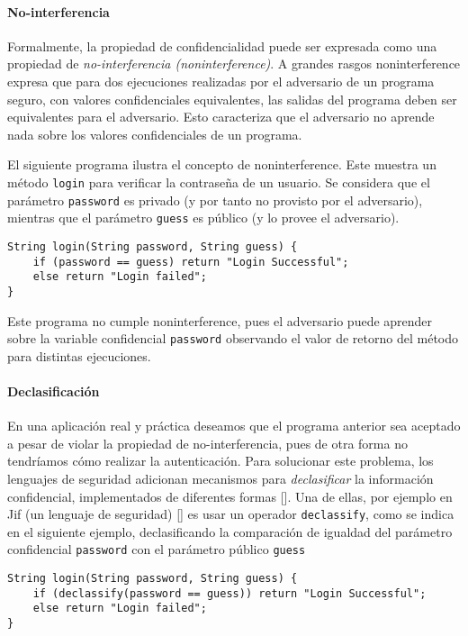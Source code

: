 	\paragraph{No-interferencia}
	Formalmente, la propiedad de confidencialidad puede ser expresada como una propiedad de \textit{no-interferencia (noninterference)}. A grandes rasgos noninterference expresa que para dos ejecuciones realizadas por el adversario de un programa seguro, con valores confidenciales equivalentes, las salidas del programa deben ser equivalentes para el adversario. Esto caracteriza que el adversario no aprende nada sobre los valores confidenciales de un programa.

	El siguiente programa ilustra el concepto de noninterference. Este muestra un método \texttt{login} para verificar la contraseña de un usuario. Se considera que el parámetro \texttt{password} es privado (y por tanto no provisto por el adversario), mientras que el parámetro \texttt{guess} es público (y lo provee el adversario).

	\begin{lstlisting}
String login(String password, String guess) {
	if (password == guess) return "Login Successful";
	else return "Login failed";
}
	\end{lstlisting}

	Este programa no cumple noninterference, pues el adversario puede aprender sobre la variable confidencial \texttt{password} observando el valor de retorno del método para distintas ejecuciones.

	\paragraph{Declasificación}
	En una aplicación real y práctica deseamos que el programa anterior sea aceptado a pesar de violar la propiedad de no-interferencia, pues de otra forma no tendríamos cómo realizar la autenticación. Para solucionar este problema, los lenguajes de seguridad adicionan mecanismos para \textit{declasificar} la información confidencial, implementados de diferentes formas []. Una de ellas, por ejemplo en Jif (un lenguaje de seguridad) [] es usar un operador \texttt{declassify}, como se indica en el siguiente ejemplo, declasificando la comparación de igualdad del parámetro confidencial \texttt{password} con el parámetro público \texttt{guess} %

	\begin{lstlisting}
String login(String password, String guess) {
	if (declassify(password == guess)) return "Login Successful";
	else return "Login failed";
}
	\end{lstlisting}

